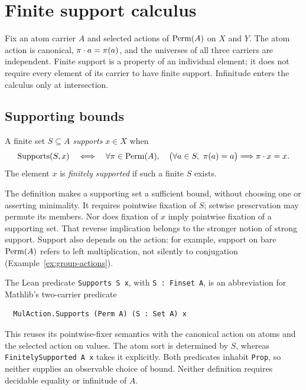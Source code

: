 \section{Finite support calculus}
\label{sec:finite-support}

Fix an atom carrier $A$ and selected actions of $\operatorname{Perm}(A)$ on $X$ and $Y$.
The atom action is canonical, $\pi\mathbin{\cdot} a=\pi(a)$, and the universes of
all three carriers are independent. Finite support is a property of an
individual element; it does not require every element of its carrier to
have finite support. Infinitude enters the calculus only at intersection.

\subsection{Supporting bounds}
\label{sec:finite-support-definition}

\begin{definition}
A finite set $S\subseteq A$ \emph{supports} $x\in X$ when
\[
  \operatorname{Supports}(S,x)
  \quad\Longleftrightarrow\quad
  \forall\pi\in\operatorname{Perm}(A),\quad
  \bigl(\forall a\in S,\ \pi(a)=a\bigr)
  \Longrightarrow \pi\mathbin{\cdot} x=x.
\]
The element $x$ is \emph{finitely supported} if such a finite $S$ exists.
\end{definition}

The definition makes a supporting set a sufficient bound, without choosing
one or asserting minimality. It requires pointwise fixation of $S$;
setwise preservation may permute its members. Nor does fixation of $x$
imply pointwise fixation of a supporting set. That reverse implication
belongs to the stronger notion of strong support. Support also depends on
the action: for example, support on bare $\operatorname{Perm}(A)$ refers to left
multiplication, not silently to conjugation
(Example~\ref{ex:group-actions}).

The Lean predicate \texttt{Supports S x}, with \texttt{S : Finset A},
is an abbreviation for Mathlib's two-carrier predicate
\begin{verbatim}
  MulAction.Supports (Perm A) (S : Set A) x
\end{verbatim}
This reuses its pointwise-fixer semantics with the canonical action on
atoms and the selected action on values. The atom sort is determined by
$S$, whereas \texttt{FinitelySupported A x} takes it explicitly.
Both predicates inhabit \texttt{Prop}, so neither supplies an observable
choice of bound. Neither definition requires decidable equality
or infinitude of $A$.

